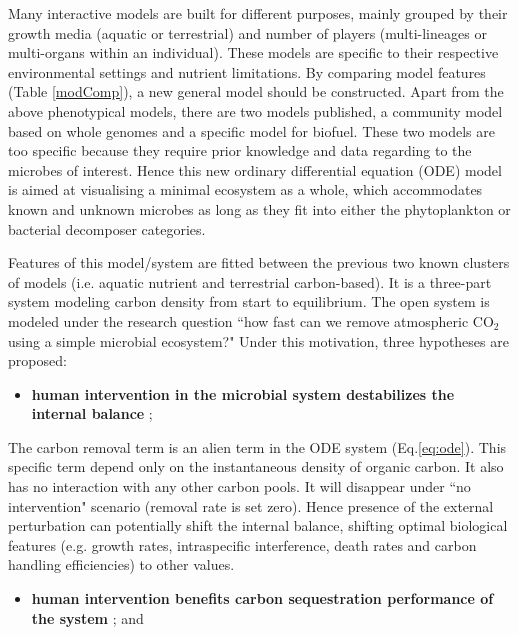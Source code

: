 \documentclass[../thesis.tex]{subfiles} %
\begin{document}
Many interactive models are built for different purposes, mainly grouped by their growth media (aquatic or terrestrial) and number of players (multi-lineages or multi-organs within an individual).  These models are specific to their respective environmental settings and nutrient limitations.  By comparing model features (Table \ref{modComp}), a new general model should be constructed.  Apart from the above phenotypical models, there are two models published, a community model based on whole genomes\autocite{harcombe2014metabolic} and a specific model for biofuel\autocite{kirthiga2014mathematical}.  These two models are too specific because they require prior knowledge and data regarding to the microbes of interest.  Hence this new ordinary differential equation (ODE) model is aimed at visualising a minimal ecosystem as a whole, which accommodates known and unknown microbes as long as they fit into either the phytoplankton or bacterial decomposer categories.

Features of this model/system are fitted between the previous two known clusters of models (i.e. aquatic nutrient and terrestrial carbon-based).  It is a three-part system modeling carbon density from start to equilibrium.  The open system is modeled under the research question ``how fast can we remove atmospheric CO$_2$ using a simple microbial ecosystem?"  Under this motivation, three hypotheses are proposed:
\begin{itemize}
    \item \textbf{human intervention in the microbial system destabilizes the internal balance}
    ;
\end{itemize}

The carbon removal term is an alien term in the ODE system (Eq.\ref{eq:ode}).  This specific term depend only on the instantaneous density of organic carbon.  It also has no interaction with any other carbon pools.  It will disappear under ``no intervention" scenario (removal rate is set zero).  Hence presence of the external perturbation can potentially shift the internal balance, shifting optimal biological features (e.g. growth rates, intraspecific interference, death rates and carbon handling efficiencies) to other values.

\begin{itemize}
    \item \textbf{human intervention benefits carbon sequestration performance of the system}
    ; and
\end{itemize}
\end{document}

